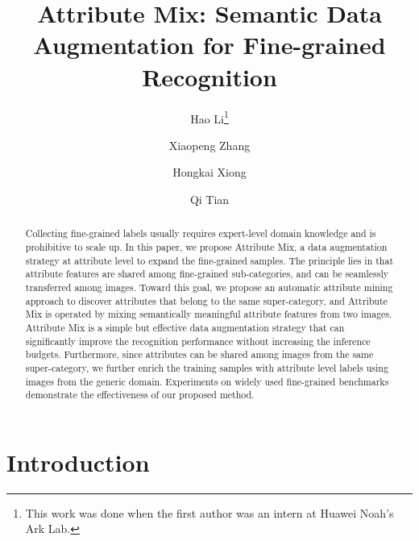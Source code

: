 \documentclass[runningheads]{llncs}
\begin{document}
\pagestyle{headings}
\mainmatter
\def\ECCVSubNumber{3475}  

\title{Attribute Mix: Semantic Data Augmentation for Fine-grained Recognition} \begin{comment}
\titlerunning{ECCV-20 submission ID \ECCVSubNumber}
\authorrunning{ECCV-20 submission ID \ECCVSubNumber}
\author{Anonymous ECCV submission}
\institute{Paper ID \ECCVSubNumber}
\end{comment}


\author{Hao Li\thanks{This work was done when the first author was an intern at Huawei Noah's Ark Lab.
} \and
Xiaopeng Zhang\and
Hongkai Xiong\and Qi Tian}

\maketitle
\vspace{-0.6cm}
\begin{abstract}
  Collecting fine-grained labels usually requires expert-level domain knowledge and is prohibitive to scale up. In this paper, we propose Attribute Mix, a data augmentation strategy at attribute level to expand the fine-grained samples. The principle lies in that attribute features are shared among fine-grained sub-categories, and can be seamlessly transferred among images. Toward this goal, we propose an automatic attribute mining approach to discover attributes that belong to the same super-category, and Attribute Mix is operated by mixing semantically meaningful attribute features from two images. Attribute Mix is a simple but effective data augmentation strategy that can significantly improve the recognition performance without increasing the inference budgets. Furthermore, since attributes can be shared among images from the same super-category, we further enrich the training samples with attribute level labels using images from the generic domain. Experiments on widely used fine-grained benchmarks demonstrate the effectiveness of our proposed method. 

\end{abstract}


\section{Introduction}
\end{document}
